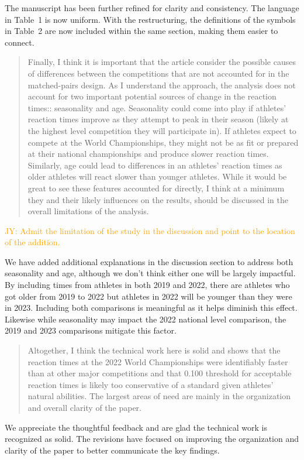 \documentclass[12pt]{article}
\newcommand{\jy}[1]{\textcolor{orange}{JY: #1}}
\newenvironment{comment}%
{\begin{quotation}\noindent\small\it\color{darkblue}\ignorespaces%
}{\end{quotation}}
\begin{document}
The manuscript has been further refined for clarity and
consistency. The language in Table~1 is now uniform. With the
restructuring, the definitions of the symbols in Table~2 are now
included within the same section, making them easier to connect.

\begin{comment}
Finally, I think it is important that the article consider the possible causes
of differences between the competitions that are not accounted for in the
matched-pairs design. As I understand the approach, the analysis does not
account for two important potential sources of change in the reaction times::
seasonality and age. Seasonality could come into play if athletes' reaction
times improve as they attempt to peak in their season (likely at the highest
level competition they will participate in). If athletes expect to compete at
the World Championships, they might not be as fit or prepared at their national
championships and produce slower reaction times. Similarly, age could lead to
differences in an athletes' reaction times as older athletes will react slower
than younger athletes. While it would be great to see these features accounted
for directly, I think at a minimum they and their likely influences on the
results, should be discussed in the overall limitations of the analysis.
\end{comment}

\jy{Admit the limitation of the study in the discussion and point to
  the location of the addition.}

We have added additional explanations in the discussion section to address both
seasonality and age, although we don't think either one will be largely
impactful.  By including times from athletes in both 2019 and 2022, there are
athletes who got older from 2019 to 2022 but athletes in 2022 will be younger
than they were in 2023.  Including both comparisons is meaningful as it helps
diminish this effect.  Likewise while seasonality may impact the 2022 national
level comparison, the 2019 and 2023 comparisons mitigate this factor.

\begin{comment}
Altogether, I think the technical work here is solid and shows that the reaction
times at the 2022 World Championships were identifiably faster than at other
major competitions and that 0.100 threshold for acceptable reaction times is
likely too conservative of a standard given athletes' natural abilities. The
largest areas of need are mainly in the organization and overall clarity of the
paper.
\end{comment}

We appreciate the thoughtful feedback and are glad the technical work
is recognized as solid. The revisions have focused on improving the
organization and clarity of the paper to better communicate the key
findings.




\end{document}
